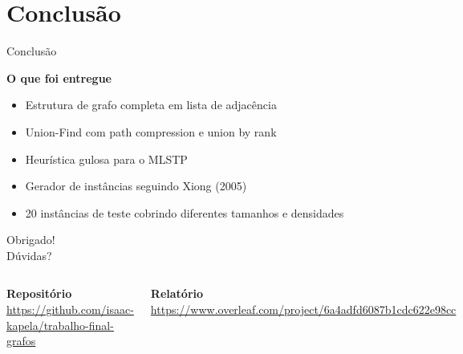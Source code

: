 \documentclass{beamer}
\begin{document}
\section{Conclusão}

\begin{frame}{Conclusão}

    \textbf{O que foi entregue}
    \begin{itemize}
        \item Estrutura de grafo completa em lista de adjacência
        \item Union-Find com path compression e union by rank
        \item Heurística gulosa para o MLSTP
        \item Gerador de instâncias seguindo Xiong (2005)
        \item 20 instâncias de teste cobrindo diferentes tamanhos e densidades
    \end{itemize}

\end{frame}


\begin{frame}
    \begin{center}
        {\LARGE Obrigado!}\\[0.8cm]
        {\large Dúvidas?}\\[0.8cm]

        \begin{columns}[c]
            \centering
            \textbf{Repositório}\\[0.2cm]
            \footnotesize\url{https://github.com/isaac-kapela/trabalho-final-grafos}

            \centering
            \textbf{Relatório}\\[0.2cm]
            \footnotesize\url{https://www.overleaf.com/project/6a4adfd6087b1cdc622e98cc}
        \end{columns}
    \end{center}
\end{frame}
\end{document}
